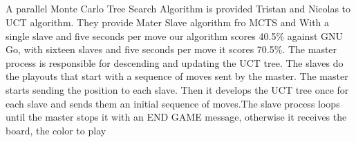 \documentclass[11pt]{article}
\begin{document}
\subsection{}
A parallel Monte Carlo Tree Search Algorithm is provided Tristan and Nicolas to UCT algorithm\cite{cazenave2008parallel}. They provide Mater Slave algorithm fro MCTS and With a single slave and five seconds per move our algorithm scores 40.5\% against GNU Go, with sixteen slaves and five seconds per move it scores 70.5\%. The master process is responsible for descending and updating the UCT tree. The slaves do the playouts  that start with a sequence of moves sent by the master. The master starts sending the position to each slave. Then it develops the UCT tree once for each slave and sends them an initial sequence of moves.The slave process loops until the master stops it with an END GAME message, otherwise it receives the board, the color to play







\end{document}
